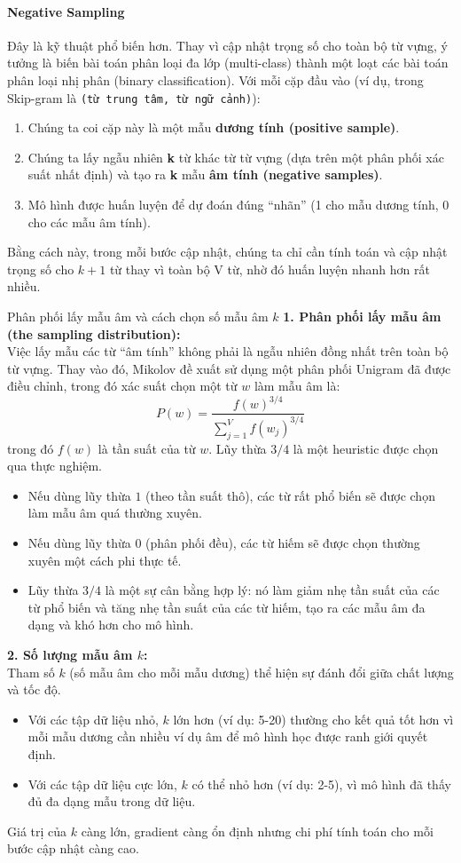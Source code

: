 \paragraph{Negative Sampling}
Đây là kỹ thuật phổ biến hơn. Thay vì cập nhật trọng số cho toàn bộ từ vựng, ý tưởng là biến bài toán phân loại đa lớp (multi-class) thành một loạt các bài toán phân loại nhị phân (binary classification). Với mỗi cặp đầu vào (ví dụ, trong Skip-gram là \texttt{(từ trung tâm, từ ngữ cảnh)}):
\begin{enumerate}
    \item Chúng ta coi cặp này là một mẫu \textbf{dương tính (positive sample)}.
    \item Chúng ta lấy ngẫu nhiên \textbf{k} từ khác từ từ vựng (dựa trên một phân phối xác suất nhất định) và tạo ra \textbf{k} mẫu \textbf{âm tính (negative samples)}.
    \item Mô hình được huấn luyện để dự đoán đúng “nhãn” (1 cho mẫu dương tính, 0 cho các mẫu âm tính).
\end{enumerate}
Bằng cách này, trong mỗi bước cập nhật, chúng ta chỉ cần tính toán và cập nhật trọng số cho $k+1$ từ thay vì toàn bộ V từ, nhờ đó huấn luyện nhanh hơn rất nhiều.

\begin{deepdive}{Phân phối lấy mẫu âm và cách chọn số mẫu âm $k$}
\textbf{1. Phân phối lấy mẫu âm (the sampling distribution):} \\
Việc lấy mẫu các từ “âm tính” không phải là ngẫu nhiên đồng nhất trên toàn bộ từ vựng. Thay vào đó, Mikolov đề xuất sử dụng một phân phối Unigram đã được điều chỉnh, trong đó xác suất chọn một từ $w$ làm mẫu âm là:
\[ P(w) = \frac{f(w)^{3/4}}{\sum_{j=1}^{V} f(w_j)^{3/4}} \]
trong đó $f(w)$ là tần suất của từ $w$. Lũy thừa $3/4$ là một heuristic được chọn qua thực nghiệm.
\begin{itemize}
    \item Nếu dùng lũy thừa $1$ (theo tần suất thô), các từ rất phổ biến sẽ được chọn làm mẫu âm quá thường xuyên.
    \item Nếu dùng lũy thừa $0$ (phân phối đều), các từ hiếm sẽ được chọn thường xuyên một cách phi thực tế.
    \item Lũy thừa $3/4$ là một sự cân bằng hợp lý: nó làm giảm nhẹ tần suất của các từ phổ biến và tăng nhẹ tần suất của các từ hiếm, tạo ra các mẫu âm đa dạng và khó hơn cho mô hình.
\end{itemize}

\textbf{2. Số lượng mẫu âm $k$:} \\
Tham số $k$ (số mẫu âm cho mỗi mẫu dương) thể hiện sự đánh đổi giữa chất lượng và tốc độ.
\begin{itemize}
    \item Với các tập dữ liệu nhỏ, $k$ lớn hơn (ví dụ: 5-20) thường cho kết quả tốt hơn vì mỗi mẫu dương cần nhiều ví dụ âm để mô hình học được ranh giới quyết định.
    \item Với các tập dữ liệu cực lớn, $k$ có thể nhỏ hơn (ví dụ: 2-5), vì mô hình đã thấy đủ đa dạng mẫu trong dữ liệu.
\end{itemize}
Giá trị của $k$ càng lớn, gradient càng ổn định nhưng chi phí tính toán cho mỗi bước cập nhật càng cao.
\end{deepdive}

